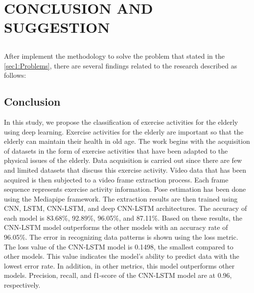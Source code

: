 \chapter{CONCLUSION AND SUGGESTION}
\label{chap5:ConclusionSuggestion}
\vspace{1ex}
\section*{}
After implement the methodology to solve the problem that stated in the
\ref{sec1:Problems}, there are several findings related to the research described as follows: \vspace{1ex}

\section{Conclusion}
\label{sec4:Conclusion}
\vspace{1ex}
In this study, we propose the classification of exercise activities for the elderly using deep learning. Exercise activities for the elderly are important so that the elderly can maintain their health in old age. The work begins with the acquisition of datasets in the form of exercise activities that have been adapted to the physical issues of the elderly. Data acquisition is carried out since there are few and limited datasets that discuss this exercise activity. Video data that has been acquired is then subjected to a video frame extraction process. Each frame sequence represents exercise activity information. Pose estimation has been done using the Mediapipe framework. The extraction results are then trained using CNN, LSTM, CNN-LSTM, and deep CNN-LSTM architectures. The accuracy of each model is 83.68\%, 92.89\%, 96.05\%, and 87.11\%. Based on these results, the CNN-LSTM model outperforms the other models with an accuracy rate of 96.05\%. The error in recognizing data patterns is shown using the loss metric. The loss value of the CNN-LSTM model is 0.1498, the smallest compared to other models. This value indicates the model's ability to predict data with the lowest error rate. In addition, in other metrics, this model outperforms other models. Precision, recall, and f1-score of the CNN-LSTM model are at 0.96, respectively.
